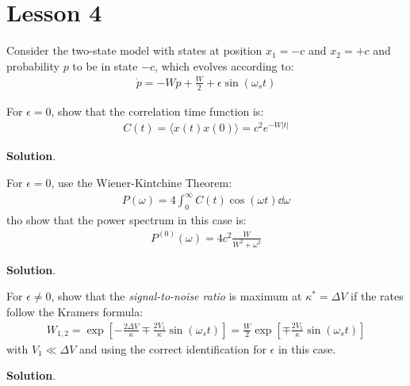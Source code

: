 \documentclass[../template.tex]{subfiles}
\begin{document}
\chapter{Lesson 4}
Consider the two-state model with states at position $x_1 = -c$ and $x_2 = +c$ and probability $p$ to be in state $-c$, which evolves according to:
\begin{align*}
    \dot{p} = -W p + \frac{W}{2} + \epsilon \sin(\omega_s t) 
\end{align*}

\begin{exo}
    For $\epsilon=0$, show that the correlation time function is:
    \begin{align*}
        C(t) = \langle x(t) x(0) \rangle = c^2 e^{-W|t|}    
    \end{align*}

    \medskip

    \textbf{Solution}. 
    
\end{exo}

\begin{exo}
    For $\epsilon=0$, use the Wiener-Kintchine Theorem:
    \begin{align*}
        P(\omega) = 4 \int_0^\infty C(t)\cos(\omega t) \dd{\omega}
    \end{align*}
    tho show that the power spectrum in this case is:
    \begin{align*}
        P^{(0)}(\omega) = 4c^2 \frac{W}{W^2+ \omega^2} 
    \end{align*}

    \medskip

    \textbf{Solution}. 
\end{exo}

\begin{exo}
    For $\epsilon \neq 0$, show that the \textit{signal-to-noise ratio} is maximum at $\kappa^* = \Delta V$ if the rates follow the Kramers formula:
    \begin{align*}
        W_{1,2} = \exp\left[-\frac{2 \Delta V}{\kappa} \mp \frac{2V_1}{\kappa} \sin(\omega_s t)  \right] = \frac{W}{2} \exp\left[\mp \frac{2V_1}{\kappa} \sin(\omega_s t) \right] 
    \end{align*} 
    with $V_1 \ll \Delta V$ and using the correct identification for $\epsilon$ in this case.

    \medskip

    \textbf{Solution}. 
\end{exo}
\end{document}
